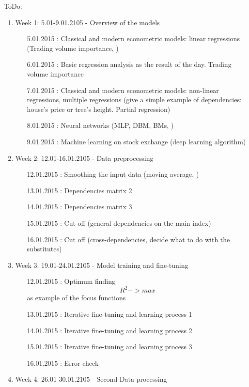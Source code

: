 \documentclass {article}
\begin{document}
ToDo:
\begin{enumerate}
	\item Week 1: 5.01-9.01.2105 - Overview of the models 
	\begin{enumerate}
		\item[5.01.2015]: Classical and modern econometric models:  linear regressions (Trading volume importance, )
		\item[6.01.2015]: Basic regression analysis as the result of the day. Trading volume importance						  
		\item[7.01.2015]: Classical and modern econometric models:  non-linear regressions, multiple regressions (give a simple example of dependencies: house's price or tree's height. Partial regression)
		\item[8.01.2015]: Neural networks (MLP, DBM, BMs, )
		\item[9.01.2015]: Machine learning on stock exchange (deep learning algorithm)
	\end{enumerate}
	\item Week 2: 12.01-16.01.2105 - Data preprocessing
	\begin{enumerate}
		\item[12.01.2015]: Smoothing the input data (moving average, )
		\item[13.01.2015]: Dependencies matrix 2
		\item[14.01.2015]: Dependencies matrix 3
		\item[15.01.2015]: Cut off (general dependencies on the main index)
		\item[16.01.2015]: Cut off (cross-dependencies, decide what to do with the substitutes)
	\end{enumerate}
	\item Week 3: 19.01-24.01.2105 - Model training and fine-tuning
	\begin{enumerate}
		\item[12.01.2015]: Optimum finding  \[ R^2 -> max \] as example of the focus functions
		\item[13.01.2015]: Iterative fine-tuning and learning process 1
		\item[14.01.2015]: Iterative fine-tuning and learning process 2
		\item[15.01.2015]: Iterative fine-tuning and learning process 3
		\item[16.01.2015]: Error check
	\end{enumerate}
	\item Week 4: 26.01-30.01.2105 - Second Data processing
	\begin{enumerate}

\end{enumerate}
\end{enumerate}
\end{document}
